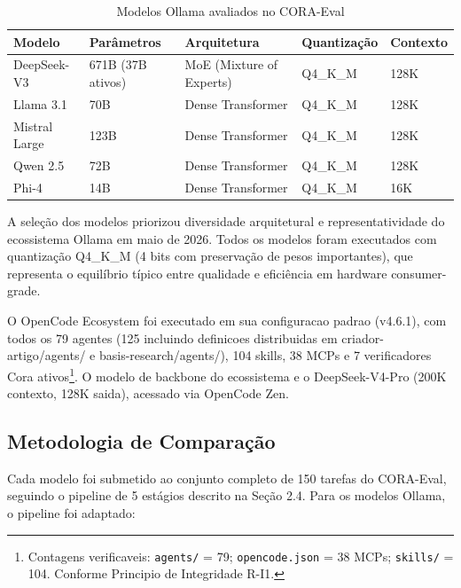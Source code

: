 \begin{table}[H]\centering
\caption{Modelos Ollama avaliados no CORA-Eval}
\label{tab:ollama_models}
\begin{tabular}{p{}p{}p{}p{}p{}}
\toprule
\textbf{Modelo} & \textbf{Parâmetros} & \textbf{Arquitetura} & \textbf{Quantização} & \textbf{Contexto} \\
\midrule
DeepSeek-V3 & 671B (37B ativos) & MoE (Mixture of Experts) & Q4\_K\_M & 128K \\
Llama 3.1 & 70B & Dense Transformer & Q4\_K\_M & 128K \\
Mistral Large & 123B & Dense Transformer & Q4\_K\_M & 128K \\
Qwen 2.5 & 72B & Dense Transformer & Q4\_K\_M & 128K \\
Phi-4 & 14B & Dense Transformer & Q4\_K\_M & 16K \\
\bottomrule
\end{tabular}
\end{table}

A seleção dos modelos priorizou diversidade arquitetural e representatividade
do ecossistema Ollama em maio de 2026. Todos os modelos foram executados com
quantização Q4\_K\_M (4 bits com preservação de pesos importantes), que
representa o equilíbrio típico entre qualidade e eficiência em hardware
consumer-grade.

O OpenCode Ecosystem foi executado em sua configuracao padrao (v4.6.1), com
todos os 79 agentes (125 incluindo definicoes distribuidas em
criador-artigo/agents/ e basis-research/agents/), 104 skills, 38 MCPs e 7
verificadores Cora ativos\footnote{Contagens verificaveis: \texttt{agents/} =
79; \texttt{opencode.json} = 38 MCPs; \texttt{skills/} = 104. Conforme
Principio de Integridade R-I1.}.
O modelo de backbone do ecossistema e o DeepSeek-V4-Pro (200K contexto,
128K saida), acessado via OpenCode Zen.

\subsection{Metodologia de Comparação}

Cada modelo foi submetido ao conjunto completo de 150 tarefas do CORA-Eval,
seguindo o pipeline de 5 estágios descrito na Seção 2.4. Para os modelos
Ollama, o pipeline foi adaptado:

